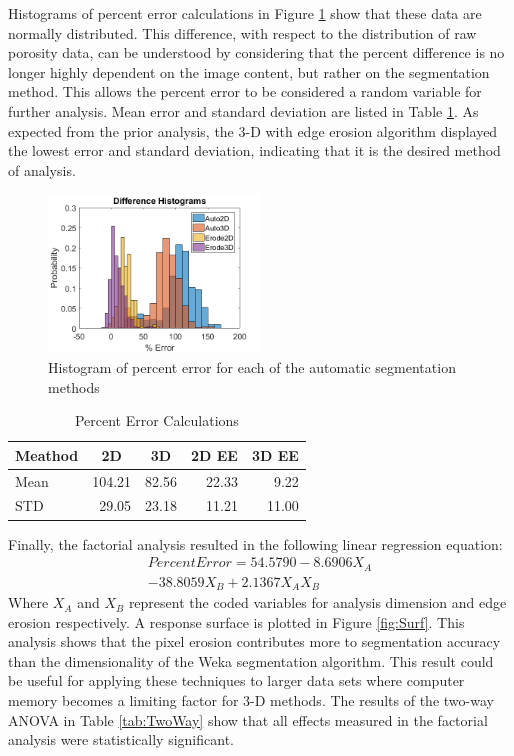 \documentclass[11pt, twocolumn]{article}
\begin{document}
Histograms of percent error calculations in Figure \ref{fig:DiffHist} show that these data are normally distributed. This difference, with respect to the distribution of raw porosity data, can be understood by considering that the percent difference is no longer highly dependent on the image content, but rather on the segmentation method. This allows the percent error to be considered a random variable for further analysis. Mean error and standard deviation are listed in Table \ref{tab:DiffTable}. As expected from the prior analysis, the 3-D with edge erosion algorithm displayed the lowest error and standard deviation, indicating that it is the desired method of analysis. 

\begin{figure}[H]
	\centering
	\includegraphics[width=0.5\textwidth]{DifferenceHistograms.png}
	\caption{Histogram of percent error for each of the automatic segmentation methods}
	\label{fig:DiffHist}
\end{figure}
\begin{table}[htbp]
	\centering
	\caption{Percent Error Calculations}
	\begin{tabular}{|l|r|r|r|r|}
		\toprule
		Meathod & \multicolumn{1}{c|}{2D} & \multicolumn{1}{c|}{3D} & \multicolumn{1}{c|}{2D EE} & \multicolumn{1}{c|}{3D EE} \\
		\midrule
		Mean  & 104.21 & 82.56 & 22.33 & 9.22 \\
		\midrule
		STD   & 29.05 & 23.18 & 11.21 & 11.00 \\
		\bottomrule
	\end{tabular}%
	\label{tab:DiffTable}%
\end{table}%

Finally, the factorial analysis resulted in the following linear regression equation:
\begin{multline}
Percent Error= 54.5790 - 8.6906 X_A \\
- 38.8059 X_B + 2.1367 X_A X_B
\end{multline}
Where $X_A$ and $X_B$ represent the coded variables for analysis dimension and edge erosion respectively. A response surface is plotted in Figure \ref{fig:Surf}. This analysis shows that the pixel erosion contributes more to segmentation accuracy than the dimensionality of the Weka segmentation algorithm. This result could be useful for applying these techniques to larger data sets where computer memory becomes a limiting factor for 3-D methods. The results of the two-way ANOVA in Table \ref{tab:TwoWay} show that all effects measured in the factorial analysis were statistically significant. 
\end{document}
